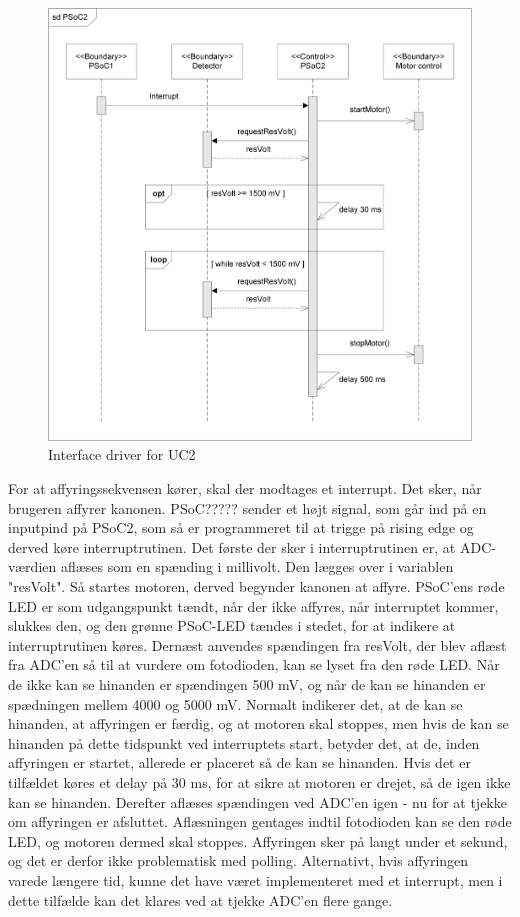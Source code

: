\begin{figure}[H]
	\centering
	\includegraphics[width=1\textwidth]{Afsnit/DesignOgImplementering/images/PSoC2sekvens.png}
	\caption{Interface driver for UC2}
	\label{fig:aktivitetsdiagramDetektor}
\end{figure}

For at affyringssekvensen kører, skal der modtages et interrupt. Det sker, når brugeren affyrer kanonen. PSoC????? sender et højt signal, som går ind på en inputpind på PSoC2, som så er programmeret til at trigge på rising edge og derved køre interruptrutinen. 
Det første der sker i interruptrutinen er, at ADC-værdien aflæses som en spænding i millivolt. Den lægges over i variablen "resVolt". Så startes motoren, derved begynder kanonen at affyre. PSoC'ens røde LED er som udgangspunkt tændt, når der ikke affyres, når interruptet kommer, slukkes den, og den grønne PSoC-LED tændes i stedet, for at indikere at interruptrutinen køres. 
Dernæst anvendes spændingen fra resVolt, der blev aflæst fra ADC'en så til at vurdere om fotodioden, kan se lyset fra den røde LED. Når de ikke kan se hinanden er spændingen 500 mV, og når de kan se hinanden er spædningen mellem 4000 og 5000 mV. Normalt indikerer det, at de kan se hinanden, at affyringen er færdig, og at motoren skal stoppes, men hvis de kan se hinanden på dette tidspunkt ved interruptets start, betyder det, at de, inden affyringen er startet, allerede er placeret så de kan se hinanden. Hvis det er tilfældet køres et delay på 30 ms, for at sikre at motoren er drejet, så de igen ikke kan se hinanden. Derefter aflæses spændingen ved ADC'en igen - nu for at tjekke om affyringen er afsluttet. Aflæsningen gentages indtil fotodioden kan se den røde LED, og motoren dermed skal stoppes. Affyringen sker på langt under et sekund, og det er derfor ikke problematisk med polling. Alternativt, hvis affyringen varede længere tid, kunne det have været implementeret med et interrupt, men i dette tilfælde kan det klares ved at tjekke ADC'en flere gange. 

